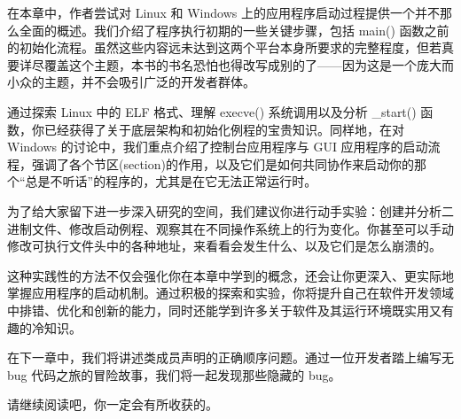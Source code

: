 在本章中，作者尝试对 Linux 和 Windows 上的应用程序启动过程提供一个并不那么全面的概述。我们介绍了程序执行初期的一些关键步骤，包括 main() 函数之前的初始化流程。虽然这些内容远未达到这两个平台本身所要求的完整程度，但若真要详尽覆盖这个主题，本书的书名恐怕也得改写成别的了——因为这是一个庞大而小众的主题，并不会吸引广泛的开发者群体。

通过探索 Linux 中的 ELF 格式、理解 execve() 系统调用以及分析 \_start() 函数，你已经获得了关于底层架构和初始化例程的宝贵知识。同样地，在对 Windows 的讨论中，我们重点介绍了控制台应用程序与 GUI 应用程序的启动流程，强调了各个节区(section)的作用，以及它们是如何共同协作来启动你的那个“总是不听话”的程序的，尤其是在它无法正常运行时。

为了给大家留下进一步深入研究的空间，我们建议你进行动手实验：创建并分析二进制文件、修改启动例程、观察其在不同操作系统上的行为变化。你甚至可以手动修改可执行文件头中的各种地址，来看看会发生什么、以及它们是怎么崩溃的。

这种实践性的方法不仅会强化你在本章中学到的概念，还会让你更深入、更实际地掌握应用程序的启动机制。通过积极的探索和实验，你将提升自己在软件开发领域中排错、优化和创新的能力，同时还能学到许多关于软件及其运行环境既实用又有趣的冷知识。

在下一章中，我们将讲述类成员声明的正确顺序问题。通过一位开发者踏上编写无 bug 代码之旅的冒险故事，我们将一起发现那些隐藏的 bug。

请继续阅读吧，你一定会有所收获的。
